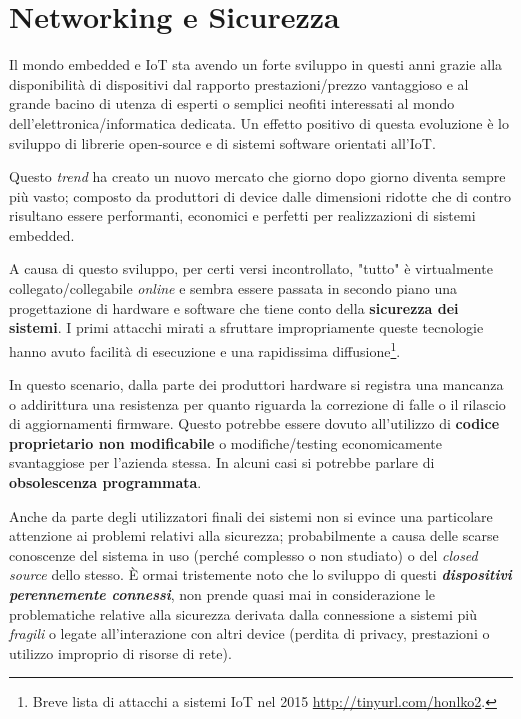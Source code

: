 \section{Networking e Sicurezza}

Il mondo embedded e IoT sta avendo un forte sviluppo in questi anni grazie alla disponibilità di dispositivi dal rapporto prestazioni/prezzo vantaggioso e al grande bacino di utenza di esperti o semplici neofiti interessati al mondo dell'elettronica/informatica dedicata. Un effetto positivo di questa evoluzione è lo sviluppo di librerie open-source e di sistemi software orientati all'IoT.

Questo \textit{trend} ha creato un nuovo mercato che giorno dopo giorno diventa sempre più vasto; composto da produttori di device dalle dimensioni ridotte che di contro risultano essere performanti, economici e perfetti per realizzazioni di sistemi embedded.

A causa di questo sviluppo, per certi versi incontrollato, "tutto" è virtualmente collegato/collegabile \textit{online} e sembra essere passata in secondo piano una progettazione di hardware e software che tiene conto della \textbf{sicurezza dei sistemi}. I primi attacchi mirati a sfruttare impropriamente queste tecnologie hanno avuto facilità di esecuzione e una rapidissima diffusione\footnote{Breve lista di attacchi a sistemi IoT nel 2015 \url{http://tinyurl.com/honlko2}.}.

In questo scenario, dalla parte dei produttori hardware si registra una mancanza o addirittura una resistenza per quanto riguarda la correzione di falle o il rilascio di aggiornamenti firmware. Questo potrebbe essere dovuto all'utilizzo di \textbf{codice proprietario non modificabile} o modifiche/testing economicamente svantaggiose per l'azienda stessa. In alcuni casi si potrebbe parlare di \textbf{obsolescenza programmata}.

Anche da parte degli utilizzatori finali dei sistemi non si evince una particolare attenzione ai problemi relativi alla sicurezza; probabilmente a causa delle scarse conoscenze del sistema in uso (perché complesso o non studiato) o del \textit{closed source} dello stesso. È ormai tristemente noto che lo sviluppo di questi \textbf{\textit{dispositivi perennemente connessi}}, non prende quasi mai in considerazione le problematiche relative alla sicurezza derivata dalla connessione a sistemi più \textit{fragili} o legate all'interazione con altri device (perdita di privacy, prestazioni o utilizzo improprio di risorse di rete).

